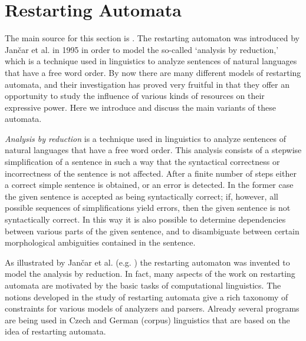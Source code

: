 %

\section{Restarting Automata}
\label{section:restarting-automata}

The main source for this section is \cite{O06}. The restarting automaton was introduced by Jančar et al. in 1995 in order to model the so-called `analysis by reduction,' which is a technique used in linguistics to analyze sentences of natural languages that have a free word order. By now there are many different models of restarting automata, and their investigation has proved very fruitful in that they offer an opportunity to study the influence of various kinds of resources on their expressive power. Here we introduce and discuss the main variants of these automata.

\emph{Analysis by reduction} is a technique used in linguistics to analyze sentences of natural languages that have a free word order. This analysis consists of a stepwise simplification of a sentence in such a way that the syntactical correctness or incorrectness of the sentence is not affected. After a finite number of steps either a correct simple sentence is obtained, or an error is detected. In the former case the given sentence is accepted as being syntactically correct; if, however, all possible sequences of simplifications yield errors, then the given sentence is not syntactically correct. In this way it is also possible to determine dependencies between various parts of the given sentence, and to disambiguate between certain morphological ambiguities contained in the sentence.

As illustrated by Jančar et al. (e.g. \cite{JMPV99}) the restarting automaton was invented to model the analysis by reduction. In fact, many aspects of the work on restarting automata are motivated by the basic tasks of computational linguistics. The notions developed in the study of restarting automata give a rich taxonomy of constraints for various models of analyzers and parsers. Already several programs are being used in Czech and German (corpus) linguistics that are based on the idea of restarting automata.

